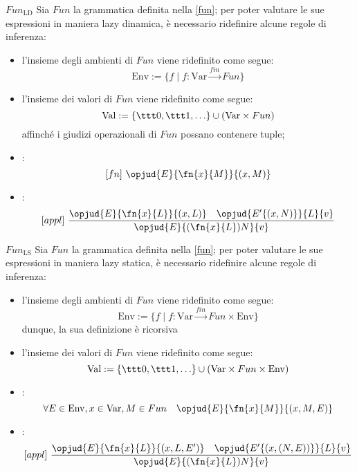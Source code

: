 \documentclass[a4paper, 12pt]{report}
\begin{document}
    \begin{framedprop}[breakable]{$Fun_\mathrm{LD}$}
        Sia $Fun$ la grammatica definita nella \cref{fun}; per poter valutare le sue espressioni in maniera lazy dinamica, è necessario ridefinire alcune regole di inferenza:

        \begin{itemize}
            \item l'insieme degli ambienti di $Fun$ viene ridefinito come segue: $$\mathrm{Env} := \{ f \mid f: \mathrm{Var} \xrightarrow{fin} Fun \}$$
            \item l'insieme dei valori di $Fun$ viene ridefinito come segue: $$\mathrm{Val} := \{ \ttt 0, \ttt 1, \ldots \} \cup (\mathrm{Var} \times Fun)$$ affinché i giudizi operazionali di $Fun$ possano contenere tuple;
            \item {}: $$[fn] \ \opjud{E}{\fn{x}{M}}{(x,M)}$$
            \item {}: $$[appl] \ \dfrac{\opjud{E}{\fn{x}{L}}{(x,L)} \quad \opjud{E'\{(x,N)\}}{L}{v}}{\opjud{E}{(\fn{x}{L})N}{v}}$$
        \end{itemize}
    \end{framedprop}

    \begin{framedprop}{$Fun_\mathrm{LS}$}
        Sia $Fun$ la grammatica definita nella \cref{fun}; per poter valutare le sue espressioni in maniera lazy statica, è necessario ridefinire alcune regole di inferenza:

        \begin{itemize}
            \item l'insieme degli ambienti di $Fun$ viene ridefinito come segue: $$\mathrm{Env} := \{f \mid f :\mathrm{Var} \xrightarrow{fin} Fun \times \mathrm{Env}\}$$ dunque, la sua definizione è ricorsiva
            \item l'insieme dei valori di $Fun$ viene ridefinito come segue: $$\mathrm{Val} := \{\ttt 0, \ttt 1, \ldots\} \cup (\mathrm{Var} \times Fun \times \mathrm{Env})$$
            \item {}: $$\forall E \in \mathrm{Env}, x \in \mathrm{Var}, M \in Fun \quad \opjud{E}{\fn{x}{M}}{(x,M,E)}$$
            \item {}: $$[appl] \ \dfrac{\opjud{E}{\fn{x}{L}}{(x,L,E')} \quad \opjud{E'\{(x,(N,E))\}}{L}{v}}{\opjud{E}{(\fn{x}{L})N}{v}}$$
        \end{itemize}
    \end{framedprop}
\end{document}
